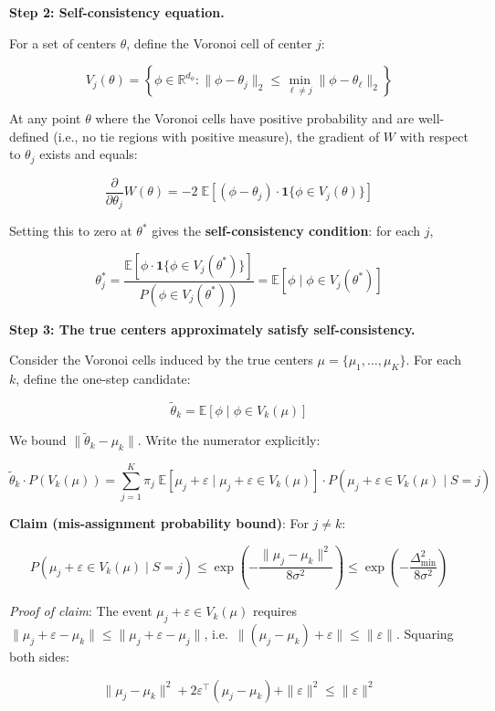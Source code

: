 \documentclass[
  12pt,
]{ctexart}
\begin{document}
\textbf{Step 2: Self-consistency equation.}

For a set of centers \(\theta\), define the Voronoi cell of center
\(j\):

\[V_j(\theta) = \left\{ \phi \in \mathbb{R}^{d_\phi} : \|\phi - \theta_j\|_2 \leq \min_{\ell \neq j} \|\phi - \theta_\ell\|_2 \right\}\]

At any point \(\theta\) where the Voronoi cells have positive
probability and are well-defined (i.e., no tie regions with positive
measure), the gradient of \(W\) with respect to \(\theta_j\) exists and
equals:

\[\frac{\partial}{\partial \theta_j} W(\theta) = -2 \; \mathbb{E}\left[ (\phi - \theta_j) \cdot \mathbf{1}\{\phi \in V_j(\theta)\} \right]\]

Setting this to zero at \(\theta^*\) gives the \textbf{self-consistency
condition}: for each \(j\),

\[\theta^*_j = \frac{\mathbb{E}[\phi \cdot \mathbf{1}\{\phi \in V_j(\theta^*)\}]}{P(\phi \in V_j(\theta^*))} = \mathbb{E}[\phi \mid \phi \in V_j(\theta^*)] \tag{1}\]

\textbf{Step 3: The true centers approximately satisfy
self-consistency.}

Consider the Voronoi cells induced by the true centers
\(\mu = \{\mu_1,\dots,\mu_K\}\). For each \(k\), define the one-step
candidate:

\[\tilde{\theta}_k = \mathbb{E}[\phi \mid \phi \in V_k(\mu)]\]

We bound \(\|\tilde{\theta}_k - \mu_k\|\). Write the numerator
explicitly:

\[\tilde{\theta}_k \cdot P(V_k(\mu)) = \sum_{j=1}^K \pi_j \; \mathbb{E}\left[ \mu_j + \varepsilon \;\big|\; \mu_j + \varepsilon \in V_k(\mu) \right] \cdot P(\mu_j + \varepsilon \in V_k(\mu) \mid S=j)\]

\textbf{Claim (mis-assignment probability bound)}: For \(j \neq k\):

\[P(\mu_j + \varepsilon \in V_k(\mu) \mid S=j) \leq \exp\left(-\frac{\|\mu_j - \mu_k\|^2}{8\sigma^2}\right) \leq \exp\left(-\frac{\Delta_{\min}^2}{8\sigma^2}\right)\]

\emph{Proof of claim}: The event \(\mu_j + \varepsilon \in V_k(\mu)\)
requires
\(\|\mu_j + \varepsilon - \mu_k\| \leq \|\mu_j + \varepsilon - \mu_j\|\),
i.e.~\(\|(\mu_j - \mu_k) + \varepsilon\| \leq \|\varepsilon\|\).
Squaring both sides:

\[\|\mu_j - \mu_k\|^2 + 2\varepsilon^\top(\mu_j - \mu_k) + \|\varepsilon\|^2 \leq \|\varepsilon\|^2\]
\end{document}
